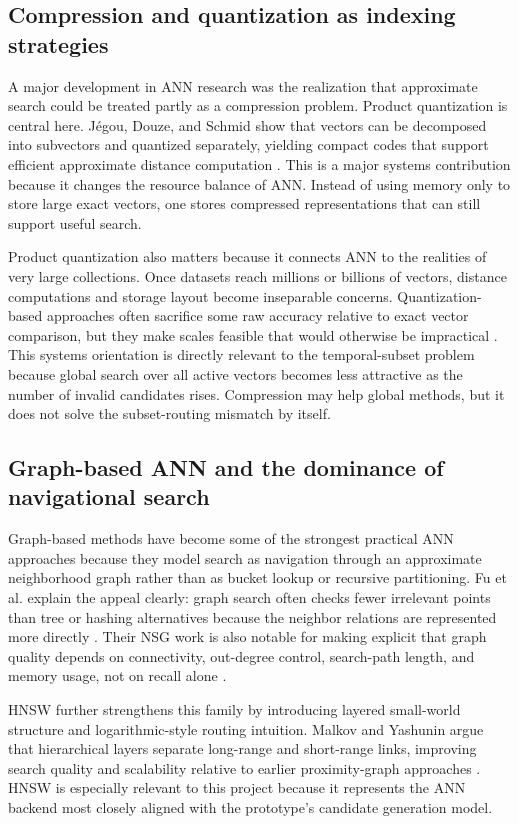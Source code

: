\documentclass[sigconf,nonacm]{acmart}
\begin{document}
\subsection{Compression and quantization as indexing strategies}

A major development in ANN research was the realization that approximate search could be treated partly as a compression problem. Product quantization is central here. J\'egou, Douze, and Schmid show that vectors can be decomposed into subvectors and quantized separately, yielding compact codes that support efficient approximate distance computation \cite{jegou2011}. This is a major systems contribution because it changes the resource balance of ANN. Instead of using memory only to store large exact vectors, one stores compressed representations that can still support useful search.

Product quantization also matters because it connects ANN to the realities of very large collections. Once datasets reach millions or billions of vectors, distance computations and storage layout become inseparable concerns. Quantization-based approaches often sacrifice some raw accuracy relative to exact vector comparison, but they make scales feasible that would otherwise be impractical \cite{jegou2011,johnson2021}. This systems orientation is directly relevant to the temporal-subset problem because global search over all active vectors becomes less attractive as the number of invalid candidates rises. Compression may help global methods, but it does not solve the subset-routing mismatch by itself.

\subsection{Graph-based ANN and the dominance of navigational search}

Graph-based methods have become some of the strongest practical ANN approaches because they model search as navigation through an approximate neighborhood graph rather than as bucket lookup or recursive partitioning. Fu et al. explain the appeal clearly: graph search often checks fewer irrelevant points than tree or hashing alternatives because the neighbor relations are represented more directly \cite{fu2019}. Their NSG work is also notable for making explicit that graph quality depends on connectivity, out-degree control, search-path length, and memory usage, not on recall alone \cite{fu2019}.

HNSW further strengthens this family by introducing layered small-world structure and logarithmic-style routing intuition. Malkov and Yashunin argue that hierarchical layers separate long-range and short-range links, improving search quality and scalability relative to earlier proximity-graph approaches \cite{malkov2020}. HNSW is especially relevant to this project because it represents the ANN backend most closely aligned with the prototype's candidate generation model.
\end{document}

